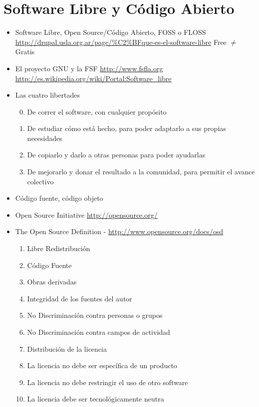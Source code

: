 
\section{Software Libre y Código Abierto}




\begin{itemize}
	\item Software Libre, Open Source/Código Abierto, FOSS o FLOSS
	\subitem \url{http://drupal.usla.org.ar/page/%C2%BFque-es-el-software-libre}
	\subitem Free $\neq$ Gratis
	\item El proyecto GNU y la FSF
	\subitem \url{http://www.fsfla.org}
	\subitem \url {http://es.wikipedia.org/wiki/Portal:Software_libre}
	\item Las cuatro libertades
\begin{enumerate} \setcounter{enumi}{-1}
	\item De correr el software, con cualquier propósito
	\item De estudiar cómo está hecho, para poder adaptarlo a sus propias necesidades
	\item De copiarlo y darlo a otras personas para poder ayudarlas
	\item De mejorarlo y donar el resultado a la comunidad, para permitir el avance colectivo
\end{enumerate}
	\item Código fuente, código objeto
	\item Open Source Initiative
	\subitem \url{http://opensource.org/} 
	\item The Open Source Definition - \url{http://www.opensource.org/docs/osd}
	\begin{enumerate}	\item Libre Redistribución
	\item Código Fuente
	\item Obras derivadas
	\item Integridad de los fuentes del autor
	\item No Discriminación contra personas o grupos
	\item No Discriminación contra campos de actividad
	\item Distribución de la licencia
	\item La licencia no debe ser específica de un producto
	\item La licencia no debe restringir el uso de otro software
	\item La licencia debe ser tecnológicamente neutra
\end{enumerate}
\end{itemize}


